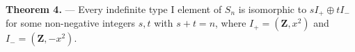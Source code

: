 \textbf{Theorem 4.} — Every indefinite type I element of $S_n$ is isomorphic to $s I_+ \oplus t I_-$ for some non-negative integers $s, t$ with $s + t = n$, where $I_+ = (\mathbf{Z}, x^2)$ and $I_- = (\mathbf{Z}, -x^2)$.
